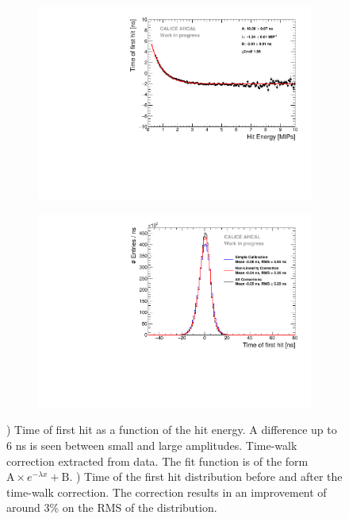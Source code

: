 \documentclass{JINST}
\begin{document}
\begin{figure}[htbp!]
	\begin{subfigure}[t]{0.49\textwidth}
		\centering
		\includegraphics[width=1\linewidth]{fig/TimeWalkProfile.pdf}
		\caption{} \label{fig:time_walk}
	\end{subfigure}
	\hfill
	\begin{subfigure}[t]{0.49\textwidth}
		\centering
		\includegraphics[width=1\linewidth]{fig/Timing_AHCAL_AllCorrection.pdf}
		\caption{} \label{fig:Timing_AllCorr}
	\end{subfigure}
	\caption{) Time of first hit as a function of the hit energy. A difference up to 6 ns is seen between small and large amplitudes. Time-walk correction extracted from data. The fit function is of the form $\text{A} \times e^{-\lambda{}x} + \text{B}$. ) Time of the first hit distribution before and after the time-walk correction. The correction results in an improvement of around 3\% on the RMS of the distribution.}
\end{figure}
\end{document}
